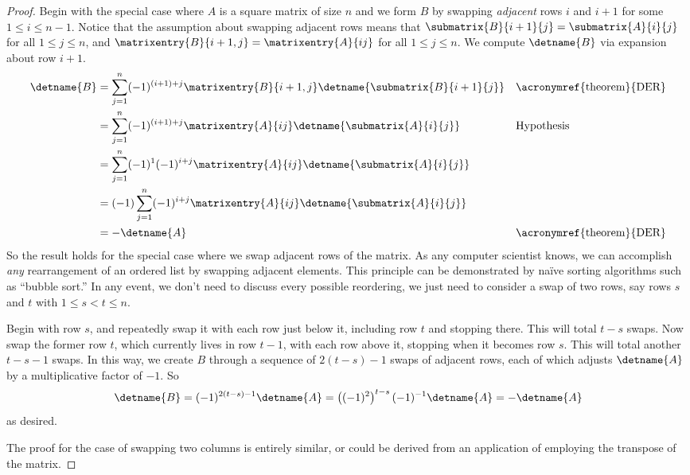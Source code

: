 %
\begin{proof}
Begin with the special case where $A$ is a square matrix of size $n$ and we form $B$ by swapping {\em adjacent} rows $i$ and $i+1$ for some $1\leq i\leq n-1$.    Notice that the assumption about swapping adjacent rows means that $\submatrix{B}{i+1}{j}=\submatrix{A}{i}{j}$ for all $1\leq j\leq n$, and $\matrixentry{B}{i+1,j}=\matrixentry{A}{ij}$ for all $1\leq j\leq n$.  We compute $\detname{B}$ via expansion about row $i+1$. 
%
\begin{align*}
\detname{B}
&=
\sum_{j=1}^{n}(-1)^{(i+1)+j}\matrixentry{B}{i+1,j}\detname{\submatrix{B}{i+1}{j}}
&&\text{\acronymref{theorem}{DER}}\\
%
&=
\sum_{j=1}^{n}(-1)^{(i+1)+j}\matrixentry{A}{ij}\detname{\submatrix{A}{i}{j}}
&&\text{Hypothesis}\\
%
&=
\sum_{j=1}^{n}(-1)^{1}(-1)^{i+j}\matrixentry{A}{ij}\detname{\submatrix{A}{i}{j}}\\
%
&=
(-1)\sum_{j=1}^{n}(-1)^{i+j}\matrixentry{A}{ij}\detname{\submatrix{A}{i}{j}}\\
%
&=
-\detname{A}&&\text{\acronymref{theorem}{DER}}
%
\end{align*}
%
So the result holds for the special case where we swap adjacent rows of the matrix.  As any computer scientist knows, we can accomplish {\em any} rearrangement of an ordered list by swapping adjacent elements.  This principle can be demonstrated by na\"ive sorting algorithms such as ``bubble sort.''  In any event, we don't need to discuss every possible reordering, we just need to consider a swap of two rows, say rows $s$ and $t$ with $1\leq s<t\leq n$.\par
%
Begin with row $s$, and repeatedly swap it with each row just below it, including row $t$ and stopping there.  This will total $t-s$ swaps.  Now swap the former row $t$, which currently lives in row $t-1$, with each row above it, stopping when it becomes row $s$.  This will total another $t-s-1$ swaps.  In this way, we create $B$ through a sequence of $2(t-s)-1$ swaps of adjacent rows, each of which adjusts $\detname{A}$ by a multiplicative factor of $-1$.  So
%
\begin{equation*}
\detname{B}
=
(-1)^{2(t-s)-1}\detname{A}
=
\left((-1)^2\right)^{t-s}(-1)^{-1}\detname{A}
=
-\detname{A}
\end{equation*}
%
as desired.\par
%
The proof for the case of swapping two columns is entirely similar, or could be derived from an application of  employing the transpose of the matrix.
%
\end{proof}
